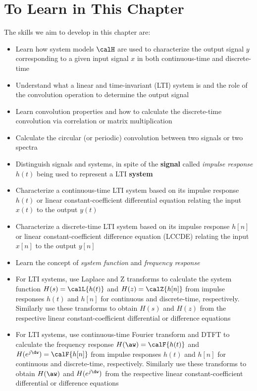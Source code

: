 \section{To Learn in This Chapter}
The skills we aim to develop in this chapter are:
\begin{itemize}
	\item Learn how system models $\calH$ are used to characterize the output signal $y$ corresponding to a given input signal $x$ in both continuous-time and discrete-time
	\item Understand what a linear and time-invariant (LTI) system is and the role of the convolution operation to determine the
	output signal
	\item Learn convolution properties and how to calculate the discrete-time convolution via correlation or matrix multiplication
	\item Calculate the circular (or periodic) convolution between two signals or two spectra
	\item Distinguish signals and systems, in spite of the \textbf{signal} called \emph{impulse response} $h(t)$ being used to represent a LTI \textbf{system}
	\item Characterize a continuous-time LTI system based on its impulse response $h(t)$ or linear constant-coefficient differential equation relating the input $x(t)$ to the output $y(t)$	
	\item Characterize a discrete-time LTI system based on its impulse response $h[n]$ or linear constant-coefficient difference equation (LCCDE) relating the input $x[n]$ to the output $y[n]$
	\item Learn the concept of \emph{system function} and \emph{frequency response}
	\item For LTI systems, use Laplace and Z transforms to calculate the system function $H(s)=\calL \{h(t) \}$ 
	and $H(z)=\calZ \{h[n] \}$ from impulse responses $h(t)$ and $h[n]$ for continuous and discrete-time, respectively. Similarly
	use these transforms to obtain $H(s)$ and $H(z)$ from the respective linear constant-coefficient differential or difference equations
	\item For LTI systems, use continuous-time Fourier transform and DTFT to calculate the frequency response $H(\aw)=\calF \{h(t) \}$ 
	and $H(e^{j \dw})=\calF \{h[n] \}$ from impulse responses $h(t)$ and $h[n]$ for continuous and discrete-time, respectively. Similarly
	use these transforms to obtain $H(\aw)$ and $H(e^{j \dw})$ from the respective linear constant-coefficient differential or difference equations	

\end{itemize}

